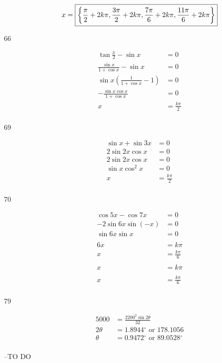 \documentclass{exam}
\newcommand{\dg}{\ensuremath{^\circ}}
\begin{document}
\begin{description}
        \[
          x = \boxed{ \left\{ \frac{\pi}{2} + 2k \pi, \frac{3 \pi}{2} + 2k \pi, \frac{7 \pi}{6} + 2k \pi, \frac{11 \pi}{6} + 2k \pi \right\} } \\
        \]

      \item[66] 
        \begin{align*}
          \tan \frac{x}{2} - \sin x                      & = 0 \\
          \frac{\sin x}{1 + \cos x} - \sin x             & = 0 \\
          \sin x \left( \frac{1}{1 + \cos x} - 1 \right) & = 0 \\
          - \frac{\sin x \cos x}{1 + \cos x}             & = 0 \\
          x                                              & = \boxed{ \frac{k \pi}{2} } \\
        \end{align*}

      \item[69] 
        \begin{align*}
          \sin x + \sin 3x & = 0 \\
          2 \sin 2x \cos x & = 0 \\
          2 \sin 2x \cos x & = 0 \\
          \sin x \cos^2 x  & = 0 \\
          x                & = \boxed{ \frac{k \pi}{2} } \\
        \end{align*}

      \item[70] 
        \begin{align*}
          \cos 5x - \cos 7x     & = 0 \\
          - 2 \sin 6x \sin (-x) & = 0 \\
          \sin 6x \sin x        & = 0 \\
          \\
          6x & = k \pi \\
          x  & = \frac{k \pi}{6} \\
          \\
          x &= k \pi \\
          \\
          x & = \boxed{ \frac{k \pi}{6} } \\
        \end{align*}

      \item[79]
        \begin{align*}
          5000     & = \frac{2200^2 \sin 2 \theta}{32} \\
          2 \theta & = 1.8944 \dg \mbox{ or } 178.1056 \\
          \theta   & = \boxed{ 0.9472 \dg \mbox{ or } 89.0528 \dg } \\
        \end{align*}

    \end{description}

  \else
    \vspace{5 cm}

    \begin{quote}
      \begin{em}
      \end{em}
    \end{quote}
    \hspace{1 cm} --TO DO
  \fi
\end{document}
